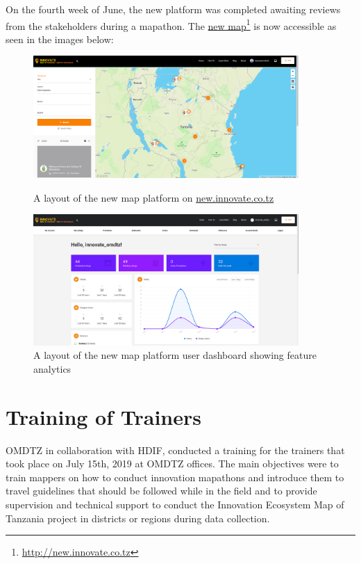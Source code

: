 \documentclass[a4paper,12pt,twoside]{article}
\begin{document}
On the fourth week of June, the new platform was completed awaiting reviews from the stakeholders during a mapathon. The \href{http://new.innovate.co.tz}{new map}\footnote{\url{http://new.innovate.co.tz}} is now accessible as seen in the images below:

\begin{figure}
	\includegraphics[width=0.9\textwidth]{images/new_new_inno_map.png}
	\caption{A layout of the new map platform on \href{http://new.innovate.co.tz}{new.innovate.co.tz }}
\bigskip \bigskip \bigskip \bigskip
	\includegraphics[width=0.9\textwidth]{images/dashboard.png}
	\caption{A layout of the new map platform user dashboard showing feature analytics }
\end{figure}

\newpage
\section{Training of Trainers}
OMDTZ in collaboration with HDIF, conducted a training for the trainers that took place on July 15th, 2019 at OMDTZ offices. The main objectives were to train mappers on how to conduct innovation mapathons and introduce them to travel guidelines that should be followed while in the field and to provide supervision and technical support to conduct the Innovation Ecosystem Map of Tanzania project in districts or regions during data collection.
\end{document}
